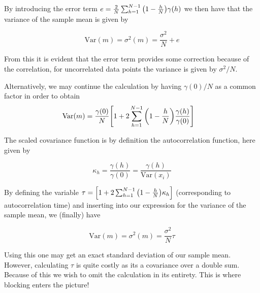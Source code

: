 \documentclass[aps,reprint,superscriptaddress,nofootinbib]{revtex4-2}
\newcommand{\Var}{\mathrm{Var}}     %
\begin{document}
    By introducing the error term $e = \frac{2}{N}\sum_{h=1}^{N-1}\qty(1-\frac{h}{N})\gamma(h)$ we then have that the variance of the sample mean is given by
    
    \begin{equation} \label{eq:var_err}
        \Var(m) = \sigma^2(m) = \frac{\sigma^2}{N} + e
    \end{equation}
    
    From this it is evident that the error term provides some correction because of the correlation, for uncorrelated data points the variance is given by $\sigma^2/N$.
    
    Alternatively, we may continue the calculation by having $\gamma(0)/N$ as a common factor in order to obtain
    \begin{align*}
        \Var(m) &= \frac{\gamma(0)}{N}\qty[1 + 2\sum_{h=1}^{N-1}\qty(1 - \frac{h}{N})\frac{\gamma(h)}{\gamma(0)}]
    \end{align*}
    
    The scaled covariance function is by definition the autocorrelation function, here given by
    
    \begin{equation*}
        \kappa_h = \frac{\gamma(h)}{\gamma(0)} = \frac{\gamma(h)}{\Var(x_i)}
    \end{equation*}
    
    By defining the variable $\tau = \qty[1 + 2\sum_{h=1}^{N-1}\qty(1-\frac{h}{N})\kappa_h]$ (corresponding to autocorrelation time) and inserting into our expression for the variance of the sample mean, we (finally) have
     
    \begin{equation*}
        \Var(m) = \sigma^2(m) = \frac{\sigma^2}{N}\tau
    \end{equation*}
   
    
    Using this one may get an exact standard deviation of our sample mean. However, calculating $\tau$ is quite costly as its a covariance over a double sum. Because of this we wish to omit the calculation in its entirety.  This is where blocking enters the picture! 

\end{document}
